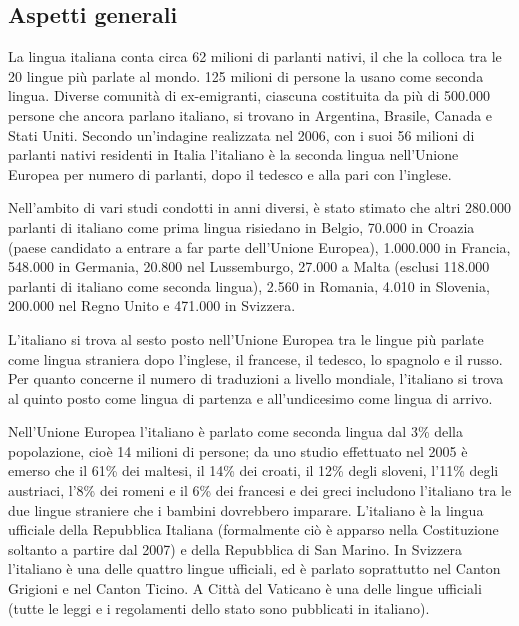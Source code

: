 \begin{multicols}{2}

\subsection{Aspetti generali}

La lingua italiana conta circa 62 milioni di parlanti nativi, il che
la colloca tra le 20 lingue pi\`{u} parlate al mondo. 125 milioni di
persone la usano come seconda lingua. Diverse comunit\`{a} di
ex-emigranti, ciascuna costituita da pi\`{u} di 500.000 persone che
ancora parlano italiano, si trovano in Argentina, Brasile, Canada e
Stati Uniti. Secondo un'indagine realizzata nel 2006,  con i suoi 56
milioni di parlanti nativi residenti in Italia l'italiano \`{e} la
seconda lingua nell'Unione Europea per numero di parlanti, dopo il
tedesco e alla pari con l'inglese. 

Nell'ambito di vari studi condotti in anni diversi, \`{e} stato stimato che altri 280.000 parlanti di italiano come prima lingua risiedano in Belgio, 70.000 in Croazia (paese candidato a entrare a far parte dell'Unione Europea), 1.000.000 in Francia, 548.000 in Germania, 20.800 nel Lussemburgo, 27.000 a Malta (esclusi 118.000 parlanti di italiano come seconda lingua), 2.560 in Romania, 4.010 in Slovenia, 200.000 nel Regno Unito e 471.000 in Svizzera.


L'italiano si trova al sesto posto nell'Unione Europea tra le lingue pi\`{u} parlate come lingua straniera dopo l'inglese, il francese, il tedesco, lo spagnolo e il russo. Per quanto concerne il numero di traduzioni a livello mondiale, l'italiano si trova al quinto posto come lingua di partenza e all'undicesimo come lingua di arrivo. 

Nell'Unione Europea l'italiano \`{e} parlato come seconda lingua dal 3\% della popolazione, cio\`{e} 14 milioni di persone; da uno studio effettuato nel 2005 \`{e} emerso che il 61\% dei maltesi, il 14\% dei croati, il 12\% degli sloveni, l'11\% degli austriaci, l'8\% dei romeni e il 6\% dei francesi e dei greci includono l'italiano tra le due lingue straniere che i bambini dovrebbero imparare.
L'italiano \`{e} la lingua ufficiale della Repubblica Italiana (formalmente
ci\`{o} \`{e} apparso nella Costituzione soltanto a partire dal 2007) e della
Repubblica di San Marino. In Svizzera l'italiano \`{e} una delle quattro
lingue ufficiali, ed \`{e} parlato soprattutto nel Canton Grigioni e nel
Canton Ticino. A Citt\`{a} del Vaticano \`{e} una delle lingue ufficiali
(tutte le leggi e i regolamenti dello stato sono pubblicati in
italiano). 


\end{multicols}
